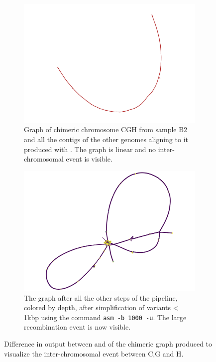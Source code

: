 \begin{figure}[h!]
	\centering
	\begin{subfigure}[b]{\textwidth}
		\centering
		\includegraphics[width=.4\linewidth]{figures/lodelo/minigraph_cgh.png}
		\caption{Graph of chimeric chromosome CGH from sample B2 and all the contigs of the other genomes aligning to it produced with \minigraph. The graph is linear and no inter-chromosomal event is visible.}
		\label{fig:cgh_mingraph}
	\end{subfigure}%

	\begin{subfigure}[b]{\textwidth}
		\centering
		\includegraphics[width=.4\linewidth]{figures/lodelo/mcactus_cgh_u1000_by_depth.png}
		\caption{The graph after all the other steps of the \mcactus pipeline, colored by depth, after simplification of variants < 1kbp using the command \gfatools  \texttt{asm -b 1000 -u}. The large recombination event is now visible.}
		\label{fig:cgh_mcactus}
	\end{subfigure}
	\caption[Difference in output between \minigraph and \mcactus.]{Difference in output between \minigraph and \mcactus of the chimeric graph produced to visualize the inter-chromosomal event between C,G and H.}
	\label{fig:chromosome_cgh_minigraph}
\end{figure}


